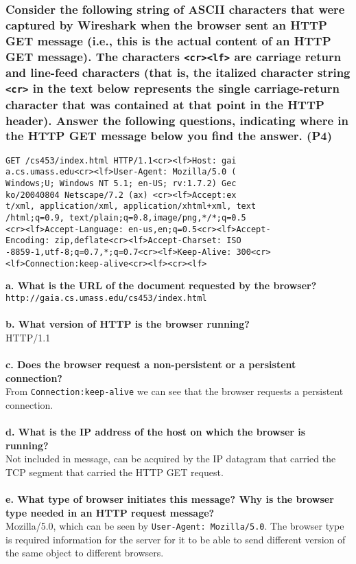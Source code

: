 \subsubsection{Consider the following string of ASCII characters that were captured by Wireshark when the browser sent an HTTP GET message (i.e., this is the actual content of an HTTP GET message). The characters \texttt{<cr><lf>} are carriage return and line-feed characters (that is, the italized character string \texttt{<cr>} in the text below represents the single carriage-return character that was contained at that point in the HTTP header). Answer the following questions, indicating where in the HTTP GET message below you find the answer. (P4)}

\begin{verbatim}
GET /cs453/index.html HTTP/1.1<cr><lf>Host: gai
a.cs.umass.edu<cr><lf>User-Agent: Mozilla/5.0 (
Windows;U; Windows NT 5.1; en-US; rv:1.7.2) Gec
ko/20040804 Netscape/7.2 (ax) <cr><lf>Accept:ex
t/xml, application/xml, application/xhtml+xml, text
/html;q=0.9, text/plain;q=0.8,image/png,*/*;q=0.5
<cr><lf>Accept-Language: en-us,en;q=0.5<cr><lf>Accept-
Encoding: zip,deflate<cr><lf>Accept-Charset: ISO
-8859-1,utf-8;q=0.7,*;q=0.7<cr><lf>Keep-Alive: 300<cr>
<lf>Connection:keep-alive<cr><lf><cr><lf>
\end{verbatim}
\noindent
\textbf{a. What is the URL of the document requested by the browser?} \\
\texttt{http://gaia.cs.umass.edu/cs453/index.html} \\
\\
\textbf{b. What version of HTTP is the browser running?} \\
HTTP/1.1 \\
\\
\textbf{c. Does the browser request a non-persistent or a persistent connection?} \\
From \texttt{Connection:keep-alive} we can see that the browser requests a persistent connection. \\
\\
\textbf{d. What is the IP address of the host on which the browser is running?} \\
Not included in message, can be acquired by the IP datagram that carried the TCP segment that carried the HTTP GET request. \\
\\
\textbf{e. What type of browser initiates this message? Why is the browser type needed in an HTTP request message?} \\
Mozilla/5.0, which can be seen by \texttt{User-Agent: Mozilla/5.0}. The browser type is required information for the server for it to be able to send different version of the same object to different browsers.


